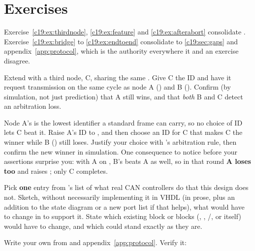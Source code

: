 
\section{Exercises}
\label{c19:sec:exercises}

\begin{aside}
Exercise~\ref{c19:ex:thirdnode}, \ref{c19:ex:feature} and \ref{c19:ex:afterabort} consolidate
. Exercise~\ref{c19:ex:bridge} to \ref{c19:ex:endtoend} consolidate
 to \ref{c19:sec:gaps} and appendix~\ref{app:protocol}, which is the authority
everywhere it and an exercise disagree.
\end{aside}

\label{c19:ex:thirdnode}
 Extend  with a third node, C, sharing the same
. Give C the ID  and have it request transmission on the same cycle as node
A () and B (). Confirm (by simulation, not just prediction) that A still
wins, and that \emph{both} B and C detect an arbitration loss.

 Node A's  is the lowest identifier a standard frame can carry, so no choice of
ID lets C beat it. Raise A's ID to , and then choose an ID for C that makes C the winner
while B () still loses. Justify your choice with 's
arbitration rule, then confirm the new winner in simulation. One consequence to notice before your
assertions surprise you: with A on , B's  beats A as well, so in that round
\textbf{A loses too} and raises ; only C completes.

\label{c19:ex:feature}
Pick \textbf{one} entry from 's list of what real CAN controllers do that this
design does not. Sketch, without necessarily implementing it in VHDL (in prose, plus an addition to
the state diagram or a new port list if that helps), what would have to change in
 to support it. State which existing block or blocks (,
, /, or  itself) would have to
change, and which could stand exactly as they are.

\label{c19:ex:bridge}
Write your own  from  and
appendix~\ref{app:protocol}. Verify it:

